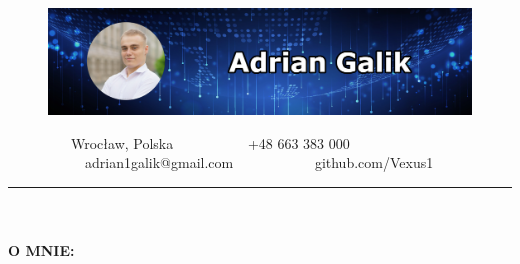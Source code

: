 \documentclass[10pt]{article}
\newcommand{\longline}{\rule{19.6cm}{1pt}}
\begin{document}
\begin{figure}[t]
    \hskip-1.55cm\includegraphics[scale=1.3625]{Galik_BANNER.png}
\end{figure}

\vspace*{-4ex}

\ \ \ \ \ \ \ \ \
\faMapMarker* Wrocław, Polska \ \ \ \ \ \ \ \ \ \
\faPhone +48 663 383 000 \ \ \ \ \ \ \ \ \ \
\faEnvelope \ adrian1galik@gmail.com \ \ \ \ \ \ \ \ \ \
\faGithub \ github.com/Vexus1


\noindent \longline 
\\ \\
\noindent \fontsize{14pt}{14pt}\selectfont \textbf{\color{Violet}O MNIE:}
\fontsize{10pt}{10pt}\selectfont
\end{document}
